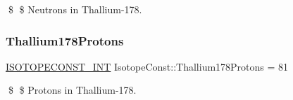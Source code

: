 \$ \$ Neutrons in Thallium-\/178. \mbox{\label{group___isotope_const-_thallium-_tl178_ga6c6ef51414d33bfffb2f2743f9264767}} 
\subsubsection{\texorpdfstring{Thallium178\+Protons}{Thallium178Protons}}
{\footnotesize\ttfamily \mbox{\hyperlink{group___isotope_const-_macros_ga5f18360b3e99483a35c32d789e62621c}{I\+S\+O\+T\+O\+P\+E\+C\+O\+N\+S\+T\+\_\+\+I\+NT}} Isotope\+Const\+::\+Thallium178\+Protons = 81}

\$ \$ Protons in Thallium-\/178. 